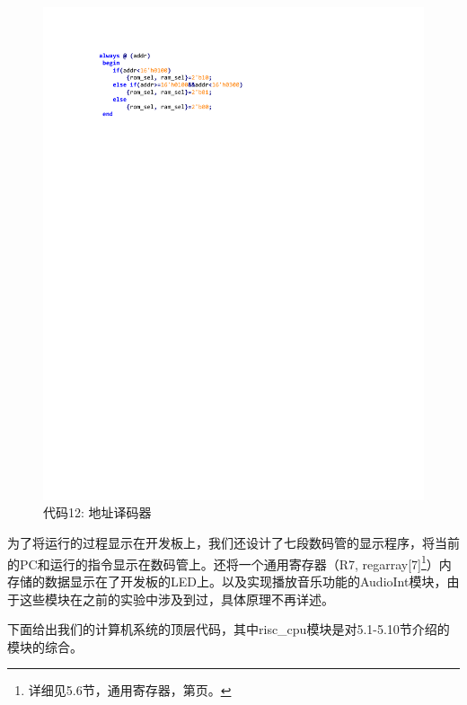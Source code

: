\documentclass[titlepage, 11pt]{article}
\begin{document}
				\begin{figure}[H]
				\centering
				\includegraphics[scale=1]{34.pdf}
				\caption*{代码12: 地址译码器}
			\end{figure}
			为了将运行的过程显示在开发板上，我们还设计了七段数码管的显示程序，将当前的PC和运行的指令显示在数码管上。还将一个通用寄存器（R7, regarray[7]\footnote{详细见5.6节，通用寄存器，第页。}）内存储的数据显示在了开发板的LED上。以及实现播放音乐功能的AudioInt模块，由于这些模块在之前的实验中涉及到过，具体原理不再详述。\par 
			下面给出我们的计算机系统的顶层代码，其中risc\_cpu模块是对5.1-5.10节介绍的模块的综合。
\end{document}
